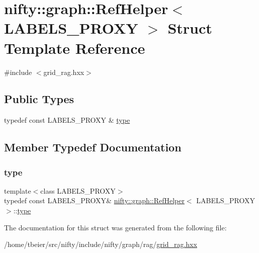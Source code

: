 \hypertarget{structnifty_1_1graph_1_1RefHelper}{}\section{nifty\+:\+:graph\+:\+:Ref\+Helper$<$ L\+A\+B\+E\+L\+S\+\_\+\+P\+R\+O\+XY $>$ Struct Template Reference}
\label{structnifty_1_1graph_1_1RefHelper}


{\ttfamily \#include $<$grid\+\_\+rag.\+hxx$>$}

\subsection*{Public Types}
\begin{DoxyCompactItemize}
\item 
typedef const L\+A\+B\+E\+L\+S\+\_\+\+P\+R\+O\+XY \& \hyperlink{structnifty_1_1graph_1_1RefHelper_a3852a95663c4836064acd3adbab0f807}{type}
\end{DoxyCompactItemize}


\subsection{Member Typedef Documentation}
\mbox{\label{structnifty_1_1graph_1_1RefHelper_a3852a95663c4836064acd3adbab0f807}} 
\subsubsection{\texorpdfstring{type}{type}}
{\footnotesize\ttfamily template$<$class L\+A\+B\+E\+L\+S\+\_\+\+P\+R\+O\+XY$>$ \\
typedef const L\+A\+B\+E\+L\+S\+\_\+\+P\+R\+O\+XY\& \hyperlink{structnifty_1_1graph_1_1RefHelper}{nifty\+::graph\+::\+Ref\+Helper}$<$ L\+A\+B\+E\+L\+S\+\_\+\+P\+R\+O\+XY $>$\+::\hyperlink{structnifty_1_1graph_1_1RefHelper_a3852a95663c4836064acd3adbab0f807}{type}}



The documentation for this struct was generated from the following file\+:\begin{DoxyCompactItemize}
\item 
/home/tbeier/src/nifty/include/nifty/graph/rag/\hyperlink{grid__rag_8hxx}{grid\+\_\+rag.\+hxx}\end{DoxyCompactItemize}
